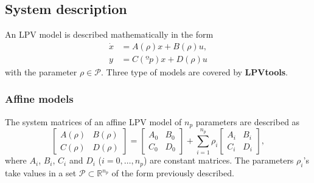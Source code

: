 \documentclass[fleqn,11pt]{article}
\newcommand{\p}{\rho}
\newcommand{\Rset}{\mathbb{R}}
\newcommand{\Pset}{\mathcal{P}}
\newcommand{\lpvtool}{\textbf{LPVtools}\xspace}
\begin{document}
\subsection{System description}\label{ssec:sysLPV}

An LPV model is described mathematically in the form
\begin{equation*}
    \begin{aligned}
        \dot x &= A(\p)x+B(\p)u,\\
        y &= C(ºp)x+D(\p)u
    \end{aligned}
\end{equation*}
with the parameter $\p\in\Pset$. Three type of models are covered by \lpvtool.

\subsubsection{Affine models}\label{sssec:sysPass}

The system matrices of an affine LPV model of $n_p$ parameters are described as
\begin{equation}\label{eq:affLPVmodel}
    \begin{bmatrix}
        A(\p) & B(\p) \\
        C(\p) & D(\p)
    \end{bmatrix} =
    \begin{bmatrix}
        A_0 & B_0 \\
        C_0 & D_0
    \end{bmatrix} + \sum_{i=1}^{n_p}\p_i
    \begin{bmatrix}
        A_i & B_i \\
        C_i & D_i
    \end{bmatrix},
\end{equation}
where $A_i$, $B_i$, $C_i$ and $D_i$ ($i=0,\dots,n_p$) are constant matrices. The parameters $\p_i$'s take values in a set $\Pset\subset\Rset^{n_p}$ of the form previously described.
\end{document}
